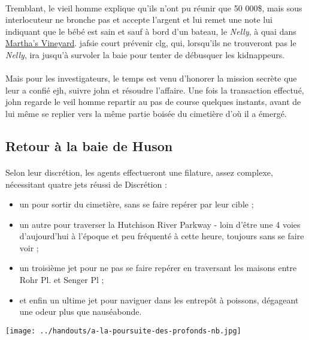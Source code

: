 \documentclass[a4paper,10pt]{article}
\begin{document}
\paragraph{} Tremblant, le vieil homme explique qu'ils n'ont pu réunir que 50 000\$, mais sous interlocuteur ne bronche pas et accepte 
l'argent et lui remet une note lui indiquant que le bébé est sain et sauf à bord d'un bateau, le \emph{Nelly}, à quai dans 
\href{http://en.wikipedia.org/wiki/Martha\%27s\_Vineyard}{Martha's Vineyard}. \gls{jafsie} court prévenir \gls{clg}, qui, lorsqu'ils ne 
trouveront pas le \emph{Nelly}, ira jusqu'à survoler la baie pour tenter de débusquer les kidnappeurs.

\paragraph{} Mais pour les investigateurs, le temps est venu d'honorer la mission secrète que leur a confié \gls{ejh}, suivre \gls{john} et
résoudre l'affaire. Une fois la transaction effectué, \gls{john} regarde le veil homme repartir au pas de course quelques instants, avant 
de lui même se replier vers la même partie boisée du cimetière d'où il a émergé.

\subsection{Retour à la baie de Huson}

\paragraph{} Selon leur discrétion, les agents effectueront une filature, assez complexe, nécessitant quatre jets réussi de Discrétion :
\begin{itemize}
 \item un pour sortir du cimetière, sans se faire repérer par leur cible ;
 \item un autre pour traverser la Hutchison River Parkway - loin d'être une 4 voies d'aujourd'hui à l'époque et peu fréquenté à cette heure,
 toujours sans se faire voir ; 
 \item un troisième jet pour ne pas se faire repérer en traversant les maisons  entre Rohr Pl. et Senger Pl ;
 \item et enfin un ultime jet pour naviguer dans les entrepôt à poissons, dégageant une odeur plus que nauséabonde.
\end{itemize}

\begin{center}
 \texttt{[image: ../handouts/a-la-poursuite-des-profonds-nb.jpg]}
\end{center}
\end{document}
